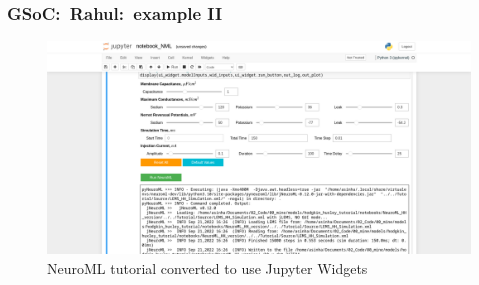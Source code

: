 \begin{frame}[c]
  \frametitle{GSoC:\ Rahul:\ example II}
  \begin{figure}[h]
    \centering
    \includegraphics[width=\textwidth]{99_images/20220922-rahul-hh-2}
    \caption{NeuroML tutorial converted to use Jupyter Widgets}%
    \label{fig:99_images-20220922-rahul-2}
  \end{figure}
\end{frame}

